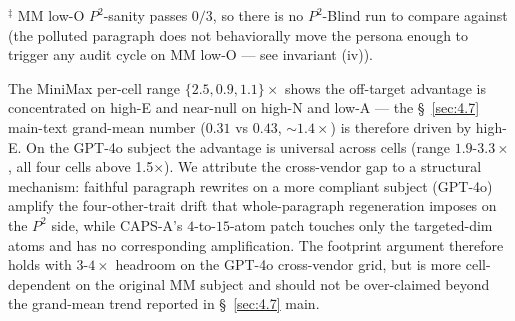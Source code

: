 \begin{table}[t]
\centering
{}
\caption{CAPS-A vs $P^{\!2}$-Blind off-target preservation at $K=15$ across four sanity-passing cells, paired across two subject backbones (MiniMax-M2.7-highspeed, GPT-4o-2024-08-06). ``off'' = mean $|\Delta\bar{s}|$ on the four non-target dims (lower is better); ratio = $P^{\!2}$-Blind off / CAPS-A off (higher is better for CAPS-A). Each cell averages 3 seeds; the per-cell mean row aggregates over cells (3 cells on MM, 4 on GPT-4o; $9$ and $12$ paired CAPS-A--$P^{\!2}$-Blind seed observations respectively). $^\ddagger$ MM low-O is undefined because $P^{\!2}$-sanity passes $0/3$ on MM low-O (no $P^{\!2}$-Blind run to compare against; see invariant (iv) below).}
\label{tab:rq7-xvendor-offtarget}
\end{table}

$^\ddagger$ MM low-O $P^{\!2}$-sanity passes $0/3$, so there is no $P^{\!2}$-Blind run to compare against (the polluted paragraph does not behaviorally move the persona enough to trigger any audit cycle on MM low-O --- see invariant (iv)).

The MiniMax per-cell range $\{2.5, 0.9, 1.1\}\times$ shows the off-target advantage is concentrated on high-E and near-null on high-N and low-A --- the \S~\ref{sec:4.7} main-text grand-mean number ($0.31$ vs $0.43$, $\sim 1.4\times$) is therefore driven by high-E. On the GPT-4o subject the advantage is universal across cells (range $1.9$-$3.3\times$, all four cells above 1.5$\times$). We attribute the cross-vendor gap to a structural mechanism: faithful paragraph rewrites on a more compliant subject (GPT-4o) amplify the four-other-trait drift that whole-paragraph regeneration imposes on the $P^{\!2}$ side, while CAPS-A's $4$-to-$15$-atom patch touches only the targeted-dim atoms and has no corresponding amplification. The footprint argument therefore holds with $3$-$4\times$ headroom on the GPT-4o cross-vendor grid, but is more cell-dependent on the original MM subject and should not be over-claimed beyond the grand-mean trend reported in \S~\ref{sec:4.7} main.

